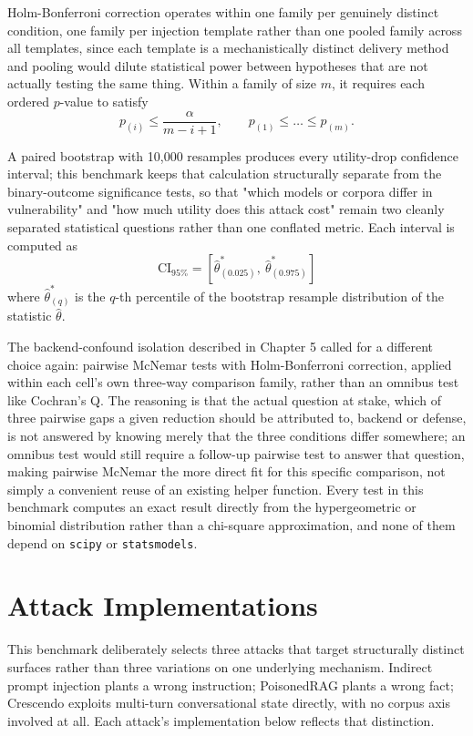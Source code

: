 Holm-Bonferroni correction \citep{holm1979simple} operates within one
family per genuinely distinct condition, one family per injection
template rather than one pooled family across all templates, since each
template is a mechanistically distinct delivery method and pooling
would dilute statistical power between hypotheses that are not actually
testing the same thing. Within a family of size $m$, it requires each
ordered $p$-value to satisfy
$$
p_{(i)} \leq \frac{\alpha}{m-i+1}, \qquad p_{(1)} \leq \dots \leq p_{(m)}.
$$

A paired bootstrap \citep{efron1979bootstrap} with 10,000 resamples
produces every utility-drop confidence interval; this benchmark keeps
that calculation structurally separate from the binary-outcome
significance tests, so that "which models or corpora differ in
vulnerability" and "how much utility does this attack cost" remain two
cleanly separated statistical questions rather than one conflated
metric. Each interval is computed as
$$
\mathrm{CI}_{95\%} = \left[\hat{\theta}^*_{(0.025)},\ \hat{\theta}^*_{(0.975)}\right]
$$
where $\hat{\theta}^*_{(q)}$ is the $q$-th percentile of the bootstrap
resample distribution of the statistic $\hat{\theta}$.

The backend-confound isolation described in Chapter 5 called for a
different choice again: pairwise McNemar tests with Holm-Bonferroni
correction, applied within each cell's own three-way comparison family,
rather than an omnibus test like Cochran's Q. The reasoning is that the
actual question at stake, which of three pairwise gaps a given reduction
should be attributed to, backend or defense, is not answered by knowing
merely that the three conditions differ somewhere; an omnibus test would
still require a follow-up pairwise test to answer that question, making
pairwise McNemar the more direct fit for this specific comparison, not
simply a convenient reuse of an existing helper function. Every test in
this benchmark computes an exact result directly from the hypergeometric
or binomial distribution rather than a chi-square approximation, and
none of them depend on \texttt{scipy} or \texttt{statsmodels}.

\section{Attack Implementations}

This benchmark deliberately selects three attacks that target
structurally distinct surfaces rather than three variations on one
underlying mechanism. Indirect prompt injection plants a wrong
instruction; PoisonedRAG plants a wrong fact; Crescendo exploits
multi-turn conversational state directly, with no corpus axis involved
at all. Each attack's implementation below reflects that distinction.


